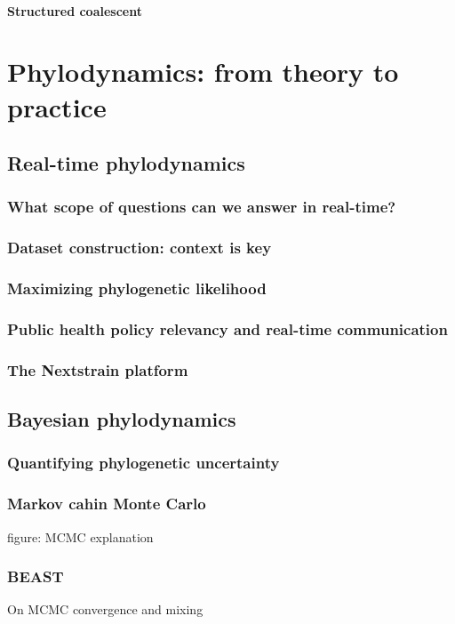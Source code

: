         \paragraph*{Structured coalescent}

  \section{Phylodynamics: from theory to practice}

    \subsection{Real-time phylodynamics}
      \subsubsection{What scope of questions can we answer in real-time?}
      \subsubsection{Dataset construction: context is key}
      \subsubsection{Maximizing phylogenetic likelihood}
      \subsubsection{Public health policy relevancy and real-time communication}
      \subsubsection{The Nextstrain platform}
    \subsection{Bayesian phylodynamics}
      \subsubsection{Quantifying phylogenetic uncertainty}
      \subsubsection{Markov cahin Monte Carlo}
      figure: MCMC explanation
      \subsubsection{BEAST}
      On MCMC convergence and mixing
